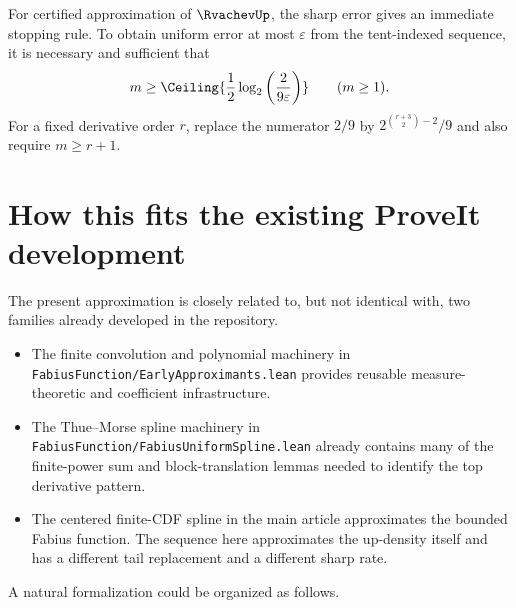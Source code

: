 \documentclass[11pt,oneside]{article}
\theoremstyle{definition}
\theoremstyle{remark}
\begin{document}
For certified approximation of $\RvachevUp$, the sharp error gives an immediate stopping rule.  To
obtain uniform error at most $\varepsilon$ from the tent-indexed sequence, it is necessary
and sufficient that
\begin{equation}
 m\ge
 \Ceiling{\frac12\log_2\left(\frac{2}{9\varepsilon}\right)}
 \qquad(m\ge1).
 \label{repeated2:eq:stopping-rule}
\end{equation}
For a fixed derivative order $r$, replace the numerator $2/9$ by
$2^{\binom{r+3}{2}-2}/9$ and also require $m\ge r+1$.

\section{How this fits the existing ProveIt development}
\label{repeated2:sec:formalization-roadmap}

The present approximation is closely related to, but not identical with, two families
already developed in the repository.

\begin{itemize}
\item The finite convolution and polynomial machinery in
\nolinkurl{FabiusFunction/EarlyApproximants.lean} provides reusable measure-theoretic and
coefficient infrastructure.
\item The Thue--Morse spline machinery in
\nolinkurl{FabiusFunction/FabiusUniformSpline.lean} already contains many of the finite-power
sum and block-translation lemmas needed to identify the top derivative pattern.
\item The centered finite-CDF spline in the main article approximates the bounded Fabius
function.  The sequence here approximates the up-density itself and has a different tail
replacement and a different sharp rate.
\end{itemize}

A natural formalization could be organized as follows.
\end{document}
